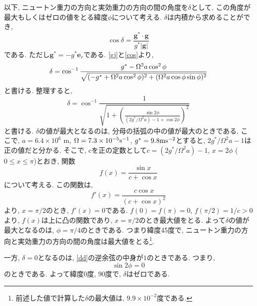 \documentclass[a4j,12pt,openbib,oneside,dvipdfmx]{jreport}
\begin{document}
\par
以下, ニュートン重力の方向と実効重力の方向の間の角度を$\delta$として, この角度が最大もしくはゼロの値をとる緯度$\phi$について考える. $\delta$は内積から求めることができ,
\begin{equation}
  \cos{\delta}=\frac{\bm{g}^*\cdot\bm{g}}{g^*\left|\bm{g}\right|} \label{cos}
\end{equation}
である. ただし$\bm{g}^*=-g^*\bm{e}_r$である. \eqref{gj}と\eqref{cos}より,
\begin{equation}
  \delta=\cos^{-1}{\frac{g^*-{\Omega^2}a\cos^2{\phi}}{\sqrt{(-g^*+\Omega^2a\cos^2{\phi})^2+(\Omega^2a\cos{\phi}\sin{\phi})^2}}} \label{delta}\\
\end{equation}
と書ける. 整理すると,
\begin{equation}
  \delta=\cos^{-1}{\frac{1}{\sqrt{1+\left(\frac{\sin{2\phi}}{(2g^*/\Omega^2a)-1+\cos{2\phi}}\right)^2}}} \label{dd}
\end{equation}
と書ける. $\delta$の値が最大となるのは, 分母の括弧の中の値が最大のときである. ここで, $a=6.4\times10^6$ m, $\Omega=7.3\times10^{-5} \rm{s}^{-1}$, $g^*=9.8 \rm{ms}^{-2}$とすると, $2g^*/\Omega^2a-1$は正の値だと分かる. そこで, cを正の定数として$c=(2g^*/\Omega^2a)-1$, $x=2\phi$ ($0\leq{x}\leq\pi$)とおき, 関数
\begin{equation}
  f(x)=\frac{\sin{x}}{c+\cos{x}}
\end{equation}
について考える. この関数は,
\begin{equation}
  f'(x)=\frac{c\cos{x}}{(c+\cos{x})^2}
\end{equation}
より, $x=\pi/2$のとき, $f'(x)=0$である. $f(0)=f(\pi)=0$, $f(\pi/2)=1/c>0$より, $f(x)$は上に凸の関数であり, $x=\pi/2$のとき最大値をとる. よって$\delta$の値が最大となるのは, $\phi=\pi/4$のときである. つまり緯度45度で, ニュートン重力の方向と実効重力の方向の間の角度は最大値をとる\footnote{前述した値で計算した$\delta$の最大値は, $9.9\times10^{-2}$度である.}.\\
\par
一方, $\delta=0$となるのは, \eqref{dd}の逆余弦の中身が$1$のときである. つまり,
\begin{equation}
  \sin{2\phi}=0
\end{equation}
のときである. よって緯度0度, 90度で, $\delta$はゼロである.
\end{document}
